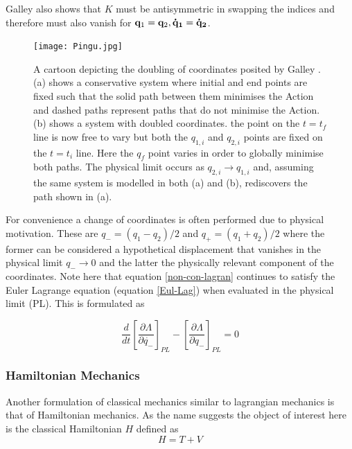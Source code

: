 \documentclass[10pt]{iopart}
\begin{document}
Galley \cite{Galley} also shows that $K$ must be antisymmetric in swapping the indices and therefore must also vanish for $\bold q_1 =\bold q_2,\bold{\dot q_1} =\bold{\dot q_2}$.

\begin{figure}
	\label{doubledCoords}
	\centering
	\texttt{[image: Pingu.jpg]}
	\caption{A cartoon depicting the doubling of coordinates posited by Galley \cite{Galley}. (a) shows a conservative system where initial and end points are fixed such that the solid path between them minimises the Action and dashed paths represent paths that do not minimise the Action. (b) shows a system with doubled coordinates. the point on the $t=t_f$ line is now free to vary but both the $q_{1,i}$ and $q_{2,i}$ points are fixed on the $t=t_i$ line. Here the $q_f$ point varies in order to globally minimise both paths. The physical limit occurs as $q_{2,i}\to q_{1,i}$ and, assuming the same system is modelled in both (a) and (b), rediscovers the path shown in (a).}
\end{figure}

For convenience a change of coordinates is often performed due to physical motivation. These are $q_- = (q_1 - q_2)/2$ and $q_+ = (q_1 + q_2)/2$  where the former can be considered a hypothetical displacement that vanishes in the physical limit $q_- \to 0$ and the latter the physically relevant component of the coordinates.
Note here that equation \ref{non-con-lagran} continues to satisfy the Euler Lagrange equation (equation \ref{Eul-Lag}) when evaluated in the physical limit (PL). This is formulated as

\begin{equation}
\label{NonConEulerLagrange}
	\frac{d}{dt} \left[\frac{\partial \Lambda}{\partial \dot{q_-}}\right]_{PL} - \left[\frac{\partial\Lambda}{\partial q_-}\right]_{PL} = 0
\end{equation}

\subsubsection{Hamiltonian Mechanics \\}
Another formulation of classical mechanics similar to lagrangian mechanics is that of Hamiltonian mechanics. As the name suggests the object of interest here is the classical Hamiltonian $H$ defined as 
\begin{equation}
\label{Hamiltonian}
	H = T + V
\end{equation}
\end{document}
